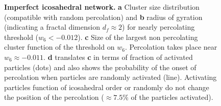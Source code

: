 \begin{figure}
	\caption{\textbf{Imperfect icosahedral network.} \textbf{a} Cluster size distribution (compatible with random percolation) and \textbf{b} radius of gyration (indicating a fractal dimension $d_f\approx 2$) for nearly percolating threshold ($w_6<-0.012$). \textbf{c} Size of the largest non percolating cluster function of the threshold on $w_6$. Percolation takes place near $w_6\approx -0.011$. \textbf{d} translates \textbf{c} in terms of fraction of activated particles (dots) and also shows the probability of the onset of percolation when particles are randomly activated (line). Activating particles function of icosahedral order or randomly do not change the position of the percolation ($\approx7.5\%$ of the particles activated).}
	\label{fig:percolation}
\end{figure}

